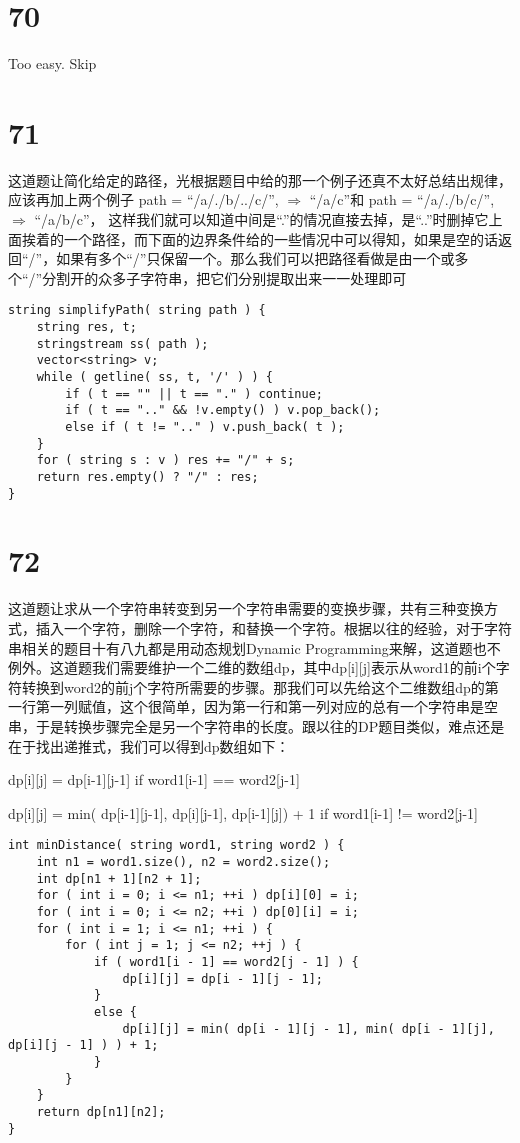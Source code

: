 \documentclass[12pt,a4paper]{article}
\begin{document}
\section{70}
Too easy. Skip

\section{71}
\begin{CJK}{UTF8}{gbsn}
这道题让简化给定的路径，光根据题目中给的那一个例子还真不太好总结出规律，应该再加上两个例子 path = ``/a/./b/../c/'', $\Rightarrow$ ``/a/c''和 path = ``/a/./b/c/'', $\Rightarrow$ ``/a/b/c''， 这样我们就可以知道中间是``.''的情况直接去掉，是``..''时删掉它上面挨着的一个路径，而下面的边界条件给的一些情况中可以得知，如果是空的话返回``/''，如果有多个``/''只保留一个。那么我们可以把路径看做是由一个或多个``/''分割开的众多子字符串，把它们分别提取出来一一处理即可
\end{CJK}
\begin{lstlisting}
string simplifyPath( string path ) {
	string res, t;
	stringstream ss( path );
	vector<string> v;
	while ( getline( ss, t, '/' ) ) {
		if ( t == "" || t == "." ) continue;
		if ( t == ".." && !v.empty() ) v.pop_back();
		else if ( t != ".." ) v.push_back( t );
	}
	for ( string s : v ) res += "/" + s;
	return res.empty() ? "/" : res;
}
\end{lstlisting}


\section{72}
\begin{CJK}{UTF8}{gbsn}
这道题让求从一个字符串转变到另一个字符串需要的变换步骤，共有三种变换方式，插入一个字符，删除一个字符，和替换一个字符。根据以往的经验，对于字符串相关的题目十有八九都是用动态规划Dynamic Programming来解，这道题也不例外。这道题我们需要维护一个二维的数组dp，其中dp[i][j]表示从word1的前i个字符转换到word2的前j个字符所需要的步骤。那我们可以先给这个二维数组dp的第一行第一列赋值，这个很简单，因为第一行和第一列对应的总有一个字符串是空串，于是转换步骤完全是另一个字符串的长度。跟以往的DP题目类似，难点还是在于找出递推式，我们可以得到dp数组如下：
\end{CJK}
\par
dp[i][j] = dp[i-1][j-1] if word1[i-1] == word2[j-1]
\par
dp[i][j] = min( dp[i-1][j-1], dp[i][j-1], dp[i-1][j]) + 1 if word1[i-1] != word2[j-1]
\begin{lstlisting}
int minDistance( string word1, string word2 ) {
	int n1 = word1.size(), n2 = word2.size();
	int dp[n1 + 1][n2 + 1];
	for ( int i = 0; i <= n1; ++i ) dp[i][0] = i;
	for ( int i = 0; i <= n2; ++i ) dp[0][i] = i;
	for ( int i = 1; i <= n1; ++i ) {
		for ( int j = 1; j <= n2; ++j ) {
			if ( word1[i - 1] == word2[j - 1] ) {
				dp[i][j] = dp[i - 1][j - 1];
			}
			else {
				dp[i][j] = min( dp[i - 1][j - 1], min( dp[i - 1][j], dp[i][j - 1] ) ) + 1;
			}
		}
	}
	return dp[n1][n2];
}
\end{lstlisting}
\end{document}
